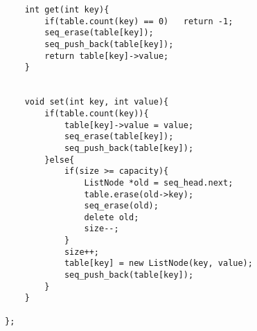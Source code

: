 \begin{description}
\begin{lstlisting}
	int get(int key){
		if(table.count(key) == 0)	return -1;
		seq_erase(table[key]);
		seq_push_back(table[key]);
		return table[key]->value;
	}


	void set(int key, int value){
		if(table.count(key)){
			table[key]->value = value;
			seq_erase(table[key]);
			seq_push_back(table[key]);
		}else{ 
			if(size >= capacity){
				ListNode *old = seq_head.next;
				table.erase(old->key);
				seq_erase(old);
				delete old;
				size--;
			}
			size++;
			table[key] = new ListNode(key, value);
			seq_push_back(table[key]);
		}
	}

};
    \end{lstlisting}
\end{description}

